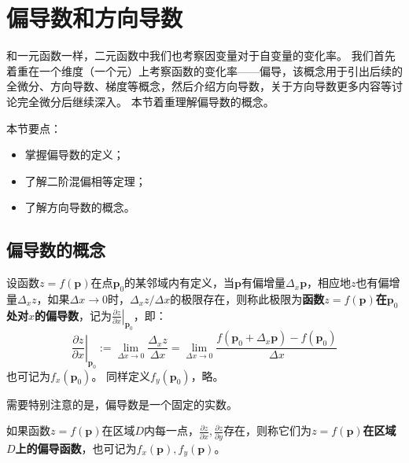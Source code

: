 \section{偏导数和方向导数}

和一元函数一样，二元函数中我们也考察因变量对于自变量的变化率。
我们首先着重在一个维度（一个元）上考察函数的变化率——偏导，该概念用于引出后续的全微分、方向导数、梯度等概念，然后介绍方向导数，关于方向导数更多内容等讨论完全微分后继续深入。
本节着重理解偏导数的概念。

本节要点：
\begin{itemize}
    \item 掌握偏导数的定义；
    \item 了解二阶混偏相等定理；
    \item 了解方向导数的概念。
\end{itemize}

\subsection{偏导数的概念}

\begin{definition}[偏导数]
设函数$z=f\left( \boldsymbol{p} \right) $在点$\boldsymbol{p}_0$的某邻域内有定义，当$\boldsymbol{p}$有偏增量$\Delta _x\boldsymbol{p}$，相应地$z$也有偏增量$\Delta _xz$，如果$\Delta x\rightarrow 0$时，$\Delta _xz/\Delta x$的极限存在，则称此极限为{\bf 函数$z=f\left( \boldsymbol{p} \right) $在$\boldsymbol{p}_0$处对$x$的偏导数}，记为$\left. \frac{\partial z}{\partial x} \right|_{\boldsymbol{p}_0}$，即：
\[
\left. \frac{\partial z}{\partial x} \right|_{\boldsymbol{p}_0}:=\underset{\Delta x\rightarrow 0}{\lim}\frac{\Delta _xz}{\Delta x}=\underset{\Delta x\rightarrow 0}{\lim}\frac{f\left( \boldsymbol{p}_0+\Delta _x\boldsymbol{p} \right) -f\left( \boldsymbol{p}_0 \right)}{\Delta x}
\]
也可记为$f_x\left( \boldsymbol{p}_0 \right) $。
同样定义$f_y\left( \boldsymbol{p}_0 \right) $，略。
\end{definition}

需要特别注意的是，偏导数是一个固定的实数。

\begin{definition}[偏导函数]
如果函数$z=f\left( \boldsymbol{p} \right) $在区域$D$内每一点，$\frac{\partial z}{\partial x},\frac{\partial z}{\partial y}
$存在，则称它们为{\bf $z=f\left( \boldsymbol{p} \right) $在区域$D$上的偏导函数}，也可记为$f_x\left( \boldsymbol{p} \right) ,f_y\left( \boldsymbol{p} \right) $。
\end{definition}

